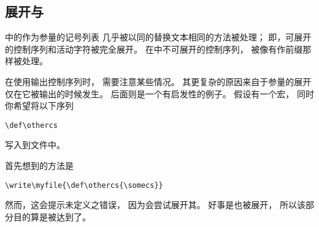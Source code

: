 \documentclass{book}
\begin{document}
\subsection{展开与}
\label{expand:write}

中的作为参量的记号列表
几乎被以同的替换文本相同的方法被处理；
即，可展开的控制序列和活动字符被完全展开。
在中不可展开的控制序列，
被像有作前缀那样被处理。

在使用输出控制序列时，
需要注意某些情况。
其更复杂的原因来自于参量的展开
仅在它被输出的时候发生。
后面则是一个有启发性的例子。
假设有一个宏，
同时你希望将以下序列
\begin{disp}\verb-\def\othercs-\rb
\end{disp}
写入到文件中。

首先想到的方法是
\begin{verbatim}
\write\myfile{\def\othercs{\somecs}}
\end{verbatim}
然而，这会提示未定义之错误，
\altt
因为会尝试展开其。
好事是也被展开，
所以该部分目的算是被达到了。
\end{document}
